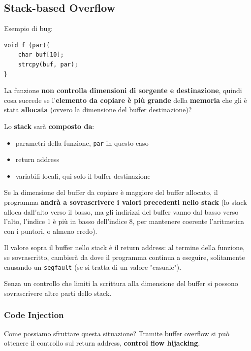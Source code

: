 \vfill

\subsection{Stack-based Overflow}

Esempio di bug: 
\begin{verbatim}
void f (par){
    char buf[10];
    strcpy(buf, par);
}
\end{verbatim}

La funzione \textbf{non controlla dimensioni di sorgente e destinazione}, quindi cosa succede se l'\textbf{elemento da copiare è più grande} della \textbf{memoria} che gli è stata \textbf{allocata} (ovvero la dimensione del buffer destinazione)?

Lo \textbf{stack} sarà \textbf{composto da}:
\begin{itemize}
	\item parametri della funzione, \texttt{par} in questo caso
    
	\item return address
	
    \item variabili locali, qui solo il buffer destinazione
\end{itemize} 

Se la dimensione del buffer da copiare è maggiore del buffer allocato, il programma \textbf{andrà a sovrascrivere i valori precedenti nello stack} (lo stack alloca dall'alto verso il basso, ma gli indirizzi del buffer vanno dal basso verso l'alto, l'indice 1 è più in basso dell'indice 8, per mantenere coerente l'aritmetica con i puntori, o almeno credo). 

Il valore sopra il buffer nello stack è il return address: al termine della funzione, se sovrascritto, cambierà da dove il programma continua a eseguire, solitamente causando un \texttt{segfault} (se si tratta di un valore "casuale").

Senza un controllo che limiti la scrittura alla dimensione del buffer si possono sovrascrivere altre parti dello stack.

\subsubsection{Code Injection}

Come possiamo sfruttare questa situazione? Tramite buffer overflow si può ottenere il controllo sul return address, \textbf{control flow hijacking}.

